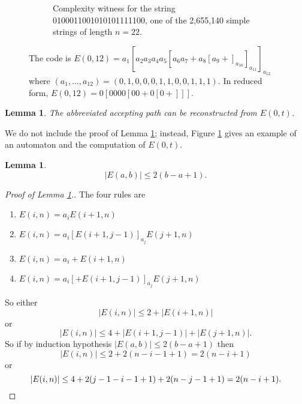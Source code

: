 \documentclass[12pt]{article}
\newcommand{\abs}[1]{\lvert#1\rvert}
\theoremstyle{plain}
\newtheorem{lem}[thm]{Lemma}
\theoremstyle{definition}
\theoremstyle{remark}
\begin{document}
\begin{figure}
\begin{subfigure}[b]{0.4\textwidth}
					\caption{
						Complexity witness for the string 0100011001010101111100, one of the 2,655,140 simple strings of length $n=22$.}
				\end{subfigure}
				\caption{
					The code is
						$E(0,12)={a_1}{[a_2a_3a_4a_5 {[a_6 a_7 + a_8 {[a_9+]}_{a_{10}}]}_{a_{11}}]}_{a_{12}}$
					where
					$(a_1, \ldots, a_{12}) = (0,1,0,0,0,1,1,0,0,1,1,1)$. In reduced form, 
						$E(0,12)=0[0000 [0 0 + 0 [0+]]]$.
				}\label{fig:Figure3}
			\end{figure}
			\begin{lem}\label{reconstructed}
				The abbreviated accepting path can be reconstructed from $E(0,t)$.
			\end{lem}
			We do not include the proof of Lemma \ref{reconstructed};
			instead, Figure \ref{fig:Figure3} gives an example of an automaton and the computation of $E(0,t)$.
			\begin{lem}\label{easy}
				\[
					\abs{E(a,b)}\le 2(b-a+1).
				\]
			\end{lem}
			\begin{proof}[Proof of Lemma \ref{easy}.]
				The four rules are
				\begin{enumerate}
					\item{} $E(i,n)=a_i E(i+1,n)$
					\item{} $E(i,n)=a_i {[ E(i+1,j-1)]}_{a_j} E(j+1,n)$
					\item{} $E(i,n)=a_i+E(i+1,n)$
					\item{} $E(i,n)=a_i {[+E(i+1,j-1)]}_{a_j} E(j+1,n)$
				\end{enumerate}
				So either
				\[
					\abs{E(i,n)}\le 2+\abs{E(i+1,n)}
				\]
				or
				\[
					\abs{E(i,n)}\le 4+\abs{E(i+1,j-1)} + \abs{E(j+1,n)}.
				\]
				So if by induction hypothesis $\abs{E(a,b)}\le 2(b-a+1)$ then
				\[
					\abs{E(i,n)}\le 2+2(n-i-1+1) = 2(n-i+1)
				\]
				or
				\[
					\abs{E(i,n)}\le 4+2(j-1-i-1+1) + 2(n-j-1+1) = 2(n-i+1).\qedhere
				\]
			\end{proof}
\end{document}
